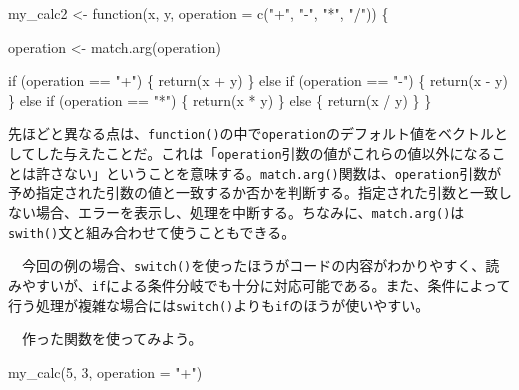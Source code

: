 \documentclass[
  a4paper,
  pandoc,
  ja=standard,
  jafont=haranoaji]{bxjsbook}
\newenvironment{Shaded}{\begin{snugshade}}{\end{snugshade}}
\newcommand{\AttributeTok}[1]{\textcolor[rgb]{0.00,0.48,0.65}{#1}}
\newcommand{\ControlFlowTok}[1]{\textcolor[rgb]{0.00,0.48,0.65}{#1}}
\newcommand{\DecValTok}[1]{\textcolor[rgb]{0.68,0.00,0.00}{#1}}
\newcommand{\FunctionTok}[1]{\textcolor[rgb]{0.28,0.35,0.67}{#1}}
\newcommand{\NormalTok}[1]{\textcolor[rgb]{0.00,0.48,0.65}{#1}}
\newcommand{\OtherTok}[1]{\textcolor[rgb]{0.00,0.48,0.65}{#1}}
\newcommand{\SpecialCharTok}[1]{\textcolor[rgb]{0.37,0.37,0.37}{#1}}
\newcommand{\StringTok}[1]{\textcolor[rgb]{0.13,0.47,0.30}{#1}}
\begin{document}
\begin{Shaded}
\begin{Highlighting}[numbers=left,,]
\NormalTok{my\_calc2 }\OtherTok{\textless{}{-}} \ControlFlowTok{function}\NormalTok{(x, y, }\AttributeTok{operation =} \FunctionTok{c}\NormalTok{(}\StringTok{"+"}\NormalTok{, }\StringTok{"{-}"}\NormalTok{, }\StringTok{"*"}\NormalTok{, }\StringTok{"/"}\NormalTok{)) \{}
  
\NormalTok{  operation }\OtherTok{\textless{}{-}} \FunctionTok{match.arg}\NormalTok{(operation)}
  
  \ControlFlowTok{if}\NormalTok{ (operation }\SpecialCharTok{==} \StringTok{"+"}\NormalTok{) \{}
    \FunctionTok{return}\NormalTok{(x }\SpecialCharTok{+}\NormalTok{ y)}
\NormalTok{  \} }\ControlFlowTok{else} \ControlFlowTok{if}\NormalTok{ (operation }\SpecialCharTok{==} \StringTok{"{-}"}\NormalTok{) \{}
    \FunctionTok{return}\NormalTok{(x }\SpecialCharTok{{-}}\NormalTok{ y)}
\NormalTok{  \} }\ControlFlowTok{else} \ControlFlowTok{if}\NormalTok{ (operation }\SpecialCharTok{==} \StringTok{"*"}\NormalTok{) \{}
    \FunctionTok{return}\NormalTok{(x }\SpecialCharTok{*}\NormalTok{ y)}
\NormalTok{  \} }\ControlFlowTok{else}\NormalTok{ \{}
    \FunctionTok{return}\NormalTok{(x }\SpecialCharTok{/}\NormalTok{ y)}
\NormalTok{  \} }
\NormalTok{\}}
\end{Highlighting}
\end{Shaded}

先ほどと異なる点は、\texttt{function()}の中で\texttt{operation}のデフォルト値をベクトルとしてした与えたことだ。これは「\texttt{operation}引数の値がこれらの値以外になることは許さない」ということを意味する。\texttt{match.arg()}関数は、\texttt{operation}引数が予め指定された引数の値と一致するか否かを判断する。指定された引数と一致しない場合、エラーを表示し、処理を中断する。ちなみに、\texttt{match.arg()}は\texttt{swith()}文と組み合わせて使うこともできる。

　今回の例の場合、\texttt{switch()}を使ったほうがコードの内容がわかりやすく、読みやすいが、\texttt{if}による条件分岐でも十分に対応可能である。また、条件によって行う処理が複雑な場合には\texttt{switch()}よりも\texttt{if}のほうが使いやすい。

　作った関数を使ってみよう。

\begin{Shaded}
\begin{Highlighting}[numbers=left,,]
\FunctionTok{my\_calc}\NormalTok{(}\DecValTok{5}\NormalTok{, }\DecValTok{3}\NormalTok{, }\AttributeTok{operation =} \StringTok{"+"}\NormalTok{)}
\end{Highlighting}
\end{Shaded}
\end{document}
